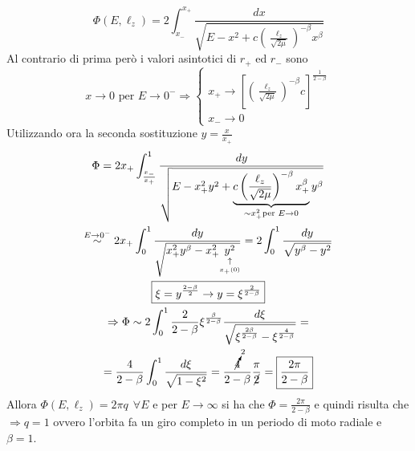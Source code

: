 \documentclass[Main.tex]{subfiles}
\begin{document}
\begin{dm}
\begin{itemize}
\begin{enumerate}
\begin{equation*}
	\Phi (E,\ell_z) =2 \int_{x_-}^{x_+}  \frac{dx}{ \sqrt{E-x^2+c\left( \frac{\ell_z}{\sqrt{2 \mu}}\right)^{-\beta} x^\beta}}
\end{equation*}
Al contrario di prima però i valori asintotici di $r_+$ ed $r_-$ sono 
\begin{equation*}
	x \rightarrow 0 \text{ per } E \rightarrow 0^- \Rightarrow \begin{cases}
		 x_+ \longrightarrow\left[ \left( \frac{\ell_z}{\sqrt{2 \mu}} \right)^{- \beta} c \right]^{\frac{1}{2- \beta}}\\
		x_- \rightarrow 0
	\end{cases}
\end{equation*}
Utilizzando ora la seconda sostituzione $y= \frac{x}{x_+}$
\begin{gather*}
	\Phi = 2 x_+ \int_\frac{x_-}{x_+} ^ 1 \frac{dy}{\sqrt{E - x_+^2 y^2 + \underbrace{c \left( \frac{\ell_z}{\sqrt{2 \mu}} \right)^{- \beta} x_+^\beta}_{ \sim x_+^2 \text{per } E \rightarrow 0} y^\beta}}
\\
	\overset{E \rightarrow 0^-}{\sim} 2 x_+ \int_0^1 \frac{dy}{\sqrt{x_+^2 y^\beta - x^2_+ \underset{\underset{x_+(0)}{\uparrow}}{y^2}}} = 2 \int_0^1 \frac{dy}{\sqrt{y^\beta - y^2}}
\\
\boxed{\xi = y^{\frac{2- \beta}{2}} \rightarrow y= \xi ^{\frac{2}{2-\beta}}}\\
\Rightarrow \Phi \sim 2 \int_0^1 \frac{2}{2-\beta} \xi ^{\frac{\beta}{2-\beta}	} \frac{d \xi}{\sqrt{\xi^{\frac{2\beta}{2-\beta}}-\xi^\frac{4}{2-\beta}}} =\\= \frac{4}{2 -\beta} \int_0^1 \frac{d \xi }{\sqrt{1-\xi^2}}= \frac{\cancelto{2}{4}}{2 -\beta} \frac{\pi}{\cancel 2} = \boxed{\frac{2 \pi}{2 -\beta}}
\end{gather*}
Allora $\Phi(E, \ell_z) = 2 \pi q \ \ \forall E$ e per $E\rightarrow \infty$ si ha che $\Phi = \frac{2 \pi}{2 -\beta}$ e quindi risulta che $\Rightarrow q=1$ ovvero l'orbita fa un giro completo in un periodo di moto radiale e $\beta=1$.
\end{enumerate}
\end{itemize}
\end{dm}


\newpage
\end{document}
